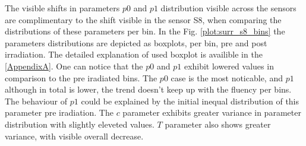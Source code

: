 The visible shifts in parameters $p0$ and $p1$ distribution visible across the sensors are complimentary to the shift visible in the sensor S8, when comparing the distributions of these parameters per bin.
In the Fig. \ref{plot:surr_s8_bins} the parameters distributions are depicted as boxplots, per bin, pre and post irradiation.
The detailed explanation of used boxplot is availible in the \ref{AppendixA}.
One can notice that the $p0$ and $p1$ exhibit lowered values in comparison to the pre iradiated bins.
The $p0$ case is the most noticable, and $p1$ although in total is lower, the trend doesn't keep up with the fluency per bins.
The behaviour of $p1$ could be explained by the initial inequal distribution of this parameter pre iradiation.
The $c$ parameter exhibits greater variance in parameter distribution with slightly eleveted values.
$T$ parameter also shows greater variance, with visible overall decrease.

